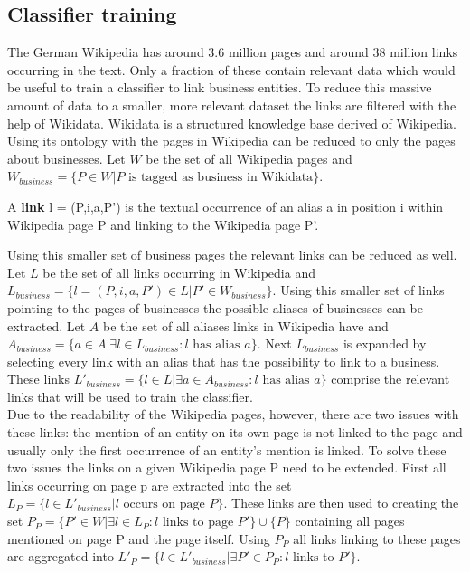 \subsection{Classifier training}
The German Wikipedia has around 3.6 million pages and around 38 million links occurring in the text. Only a fraction of these contain relevant data which would be useful to train a classifier to link business entities. To reduce this massive amount of data to a smaller, more relevant dataset the links are filtered with the help of Wikidata. Wikidata is a structured knowledge base derived of Wikipedia. Using its ontology with the pages in Wikipedia can be reduced to only the pages about businesses. Let $W$ be the set of all Wikipedia pages and $W_{business} = \{ P \in W | P \text{ is tagged as business in Wikidata} \}$.
\begin{definition}
A \textbf{link} l = (P,i,a,P') is the textual occurrence of an alias a in position i within Wikipedia page P and linking to the Wikipedia page P'.
\end{definition}
Using this smaller set of business pages the relevant links can be reduced as well. Let $L$ be the set of all links occurring in Wikipedia and $L_{business} = \{ l = (P,i,a,P') \in L | P' \in W_{business} \}$. Using this smaller set of links pointing to the pages of businesses the possible aliases of businesses can be extracted. Let $A$ be the set of all aliases links in Wikipedia have and $A_{business} = \{ a \in A | \exists l \in L_{business}: l \text{ has alias } a \}$. Next $L_{business}$ is expanded by selecting every link with an alias that has the possibility to link to a business. These links $L'_{business} = \{ l \in L | \exists a \in A_{business}: l \text{ has alias } a \}$ comprise the relevant links that will be used to train the classifier.\\
Due to the readability of the Wikipedia pages, however, there are two issues with these links: the mention of an entity on its own page is not linked to the page and usually only the first occurrence of an entity's mention is linked. To solve these two issues the links on a given Wikipedia page P need to be extended.
First all links occurring on page p are extracted into the set $L_P = \{ l \in L'_{business} | l \text{ occurs on page } P\}$. These links are then used to creating the set $P_P = \{ P' \in W | \exists l \in L_P: l \text{ links to page } P' \} \cup \{P\}$ containing all pages mentioned on page P and the page itself. Using $P_P$ all links linking to these pages are aggregated into $L'_P = \{ l \in L'_{business} | \exists P' \in P_P: l \text{ links to } P' \}$.\\
